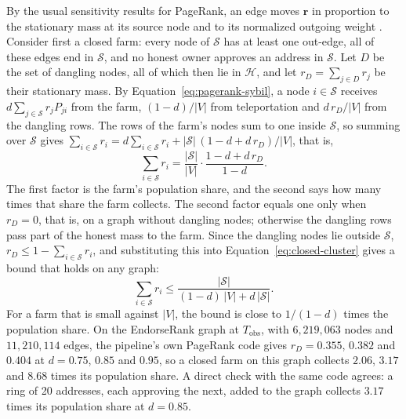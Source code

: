 By the usual sensitivity results for PageRank, an edge moves $\mathbf{r}$ in proportion to the stationary mass at its source node and to its normalized outgoing weight \parencite{langville2006pagerank}. Consider first a closed farm: every node of $\mathcal{S}$ has at least one out-edge, all of these edges end in $\mathcal{S}$, and no honest owner approves an address in $\mathcal{S}$. Let $D$ be the set of dangling nodes, all of which then lie in $\mathcal{H}$, and let $r_D=\sum_{j\in D} r_j$ be their stationary mass. By Equation~\eqref{eq:pagerank-sybil}, a node $i\in\mathcal{S}$ receives $d\sum_{j\in\mathcal{S}} r_j P_{ji}$ from the farm, $(1-d)/|V|$ from teleportation and $d\,r_D/|V|$ from the dangling rows. The rows of the farm's nodes sum to one inside $\mathcal{S}$, so summing over $\mathcal{S}$ gives $\sum_{i\in\mathcal{S}} r_i = d\sum_{i\in\mathcal{S}} r_i + |\mathcal{S}|\,(1-d+d\,r_D)/|V|$, that is,
\begin{equation}
\label{eq:closed-cluster}
\sum_{i\in\mathcal{S}} r_i = \frac{|\mathcal{S}|}{|V|}\cdot\frac{1-d+d\,r_D}{1-d}.
\end{equation}
The first factor is the farm's population share, and the second says how many times that share the farm collects. The second factor equals one only when $r_D=0$, that is, on a graph without dangling nodes; otherwise the dangling rows pass part of the honest mass to the farm. Since the dangling nodes lie outside $\mathcal{S}$, $r_D\le 1-\sum_{i\in\mathcal{S}} r_i$, and substituting this into Equation~\eqref{eq:closed-cluster} gives a bound that holds on any graph:
\begin{equation}
\label{eq:cluster-mass}
\sum_{i\in\mathcal{S}} r_i \le \frac{|\mathcal{S}|}{(1-d)\,|V| + d\,|\mathcal{S}|}.
\end{equation}
For a farm that is small against $|V|$, the bound is close to $1/(1-d)$ times the population share. On the EndorseRank graph at $T_{\mathrm{obs}}$, with $6{,}219{,}063$ nodes and $11{,}210{,}114$ edges, the pipeline's own PageRank code gives $r_D=0.355$, $0.382$ and $0.404$ at $d=0.75$, $0.85$ and $0.95$, so a closed farm on this graph collects $2.06$, $3.17$ and $8.68$ times its population share. A direct check with the same code agrees: a ring of 20 addresses, each approving the next, added to the graph collects $3.17$ times its population share at $d=0.85$.

